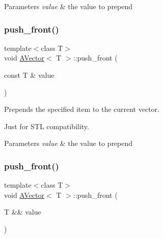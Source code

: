 \begin{DoxyParams}{Parameters}
{\em value} & the value to prepend \\
\hline
\end{DoxyParams}
\mbox{\label{class_a_vector_a18f64e22552d73fc4424dc81ba158216}} 
\subsubsection{\texorpdfstring{push\_front()}{push\_front()}\hspace{0.1cm}{\footnotesize\ttfamily [1/2]}}
{\footnotesize\ttfamily template$<$class T$>$ \\
void \mbox{\hyperlink{class_a_vector}{A\+Vector}}$<$ T $>$\+::push\+\_\+front (\begin{DoxyParamCaption}\item[{const T \&}]{value }\end{DoxyParamCaption})}



Prepends the specified item to the current vector. 

Just for S\+TL compatibility.


\begin{DoxyParams}{Parameters}
{\em value} & the value to prepend \\
\hline
\end{DoxyParams}
\mbox{\label{class_a_vector_a0050a46da378811f3ff5fc4df73ecd62}} 
\subsubsection{\texorpdfstring{push\_front()}{push\_front()}\hspace{0.1cm}{\footnotesize\ttfamily [2/2]}}
{\footnotesize\ttfamily template$<$class T$>$ \\
void \mbox{\hyperlink{class_a_vector}{A\+Vector}}$<$ T $>$\+::push\+\_\+front (\begin{DoxyParamCaption}\item[{T \&\&}]{value }\end{DoxyParamCaption})}



